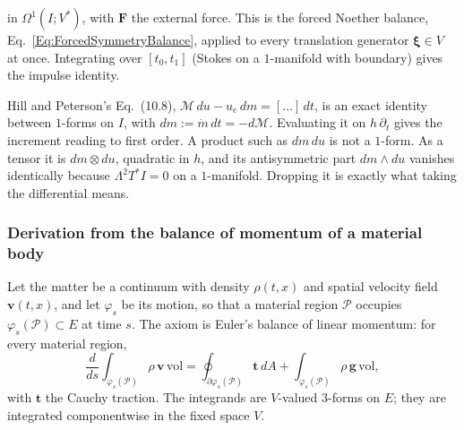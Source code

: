 \begin{description}
  in $\Omega^1(I;V^*)$, with $\mathbf F$ the external force. This is the
  forced Noether balance, Eq.~\ref{Eq:ForcedSymmetryBalance}, applied to every
  translation generator $\boldsymbol\xi\in V$ at once. Integrating over
  $[t_0,t_1]$ (Stokes on a $1$-manifold with boundary) gives the impulse
  identity.
\item[Products of differentials.] Hill and Peterson's Eq.~(10.8),
  $\mathcal M\,du-u_e\,dm=[\dots]\,dt$, is an exact identity between
  $1$-forms on $I$, with $dm:=\dot m\,dt=-d\mathcal M$. Evaluating it on
  $h\,\partial_t$ gives the increment reading to first order. A product such
  as $dm\,du$ is not a $1$-form. As a tensor it is $dm\otimes du$, quadratic
  in $h$, and its antisymmetric part $dm\wedge du$ vanishes identically
  because $\Lambda^2T^*I=0$ on a $1$-manifold. Dropping it is exactly what
  taking the differential means.
\end{description}

\subsubsection*{Derivation from the balance of momentum of a material body}
Let the matter be a continuum with density $\rho(t,x)$ and spatial velocity
field $\mathbf v(t,x)$, and let $\varphi_s$ be its motion, so that a material
region $\mathcal P$ occupies $\varphi_s(\mathcal P)\subset E$ at time $s$. The
axiom is Euler's balance of linear momentum: for every material region,
\begin{equation}\label{eq:va-euler-axiom}
 \frac{d}{ds}\int_{\varphi_s(\mathcal P)}\rho\,\mathbf v\,\mathrm{vol}
 =\oint_{\partial\varphi_s(\mathcal P)}\mathbf t\,dA
  +\int_{\varphi_s(\mathcal P)}\rho\,\mathbf g\,\mathrm{vol},
\end{equation}
with $\mathbf t$ the Cauchy traction. The integrands are $V$-valued
$3$-forms on $E$; they are integrated componentwise in the fixed space $V$.

